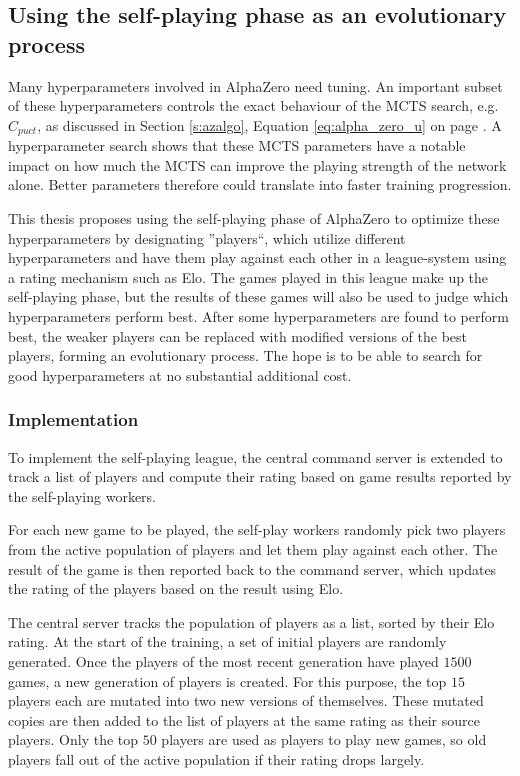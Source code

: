 \documentclass[12pt,onecolumn,oneside,titlepage]{article}
\begin{document}
\subsection{Using the self-playing phase as an evolutionary process} \label{s:novel_evolution}

Many hyperparameters involved in AlphaZero need tuning. An important subset of these hyperparameters controls the exact behaviour of
the MCTS search, e.g. $C_{puct}$, as discussed in Section \ref{s:azalgo}, Equation \ref{eq:alpha_zero_u} on page \pageref{eq:alpha_zero_u}.
A hyperparameter search shows that these MCTS parameters have a notable impact on how much the MCTS can 
improve the playing strength of the network alone. Better parameters therefore could translate into faster training progression.

This thesis proposes using the self-playing phase of AlphaZero to optimize these hyperparameters by designating ''players``,
which utilize different hyperparameters and have them play against each other in a league-system using a rating mechanism such as Elo. The games played 
in this league make up the self-playing phase, but the results of these games will also be used to judge which hyperparameters perform best.
After some hyperparameters are found to perform best, the weaker players can be replaced with modified versions 
of the best players, forming an evolutionary process. The hope is to be able to search for good hyperparameters at no substantial additional cost.

\subsubsection{Implementation}

To implement the self-playing league, the central command server is extended to track a list of players and compute their rating based on game results reported by the self-playing workers.

For each new game to be played, the self-play workers randomly pick two players from the active population of 
players and let them play against each other. The result of the game is then reported back to the command server, which updates the rating of the players based on the result using Elo.

The central server tracks the population of players as a list, sorted by their Elo rating. 
At the start of the training, a set of initial players are randomly generated.
Once the players of the most recent generation have played $1500$ games, a new generation of players is created. For this purpose, the top $15$ players each are mutated into two new versions of themselves. These mutated copies are then added to the list of players at the same rating as their source players.
Only the top $50$ players are used as players to play new games, so old players fall out of the active population if their rating drops largely.
\end{document}
